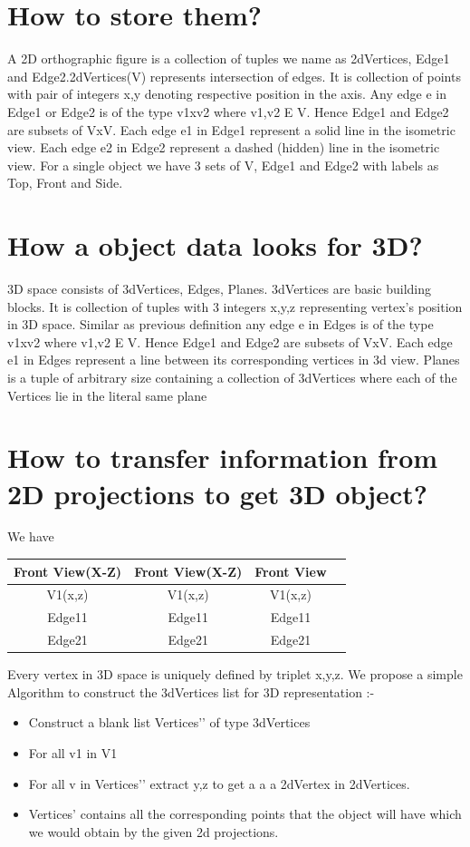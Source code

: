 \documentclass{article}
\begin{document}
\section{How to store them?}
A 2D orthographic figure is a collection of tuples we name as 2dVertices, Edge1 and Edge2.2dVertices(V) represents intersection of edges. It is collection of points with pair of integers x,y denoting respective position in the axis. Any edge e in Edge1 or Edge2 is of the type v1xv2 where v1,v2 E V. Hence Edge1 and Edge2 are subsets of VxV. Each edge e1 in Edge1 represent a solid line in the isometric view. Each edge e2 in Edge2 represent a dashed (hidden) line in the isometric view. For a single object we have 3 sets of {V, Edge1 and Edge2} with labels as Top, Front and Side.
\section{How a object data looks for 3D?}
3D space consists of 3dVertices, Edges, Planes.
3dVertices are basic building blocks. It is collection of tuples with 3 integers x,y,z representing vertex’s position in 3D space.
Similar as previous definition any edge e in Edges is of the type v1xv2 where v1,v2 E V. Hence Edge1 and Edge2 are subsets of VxV. Each edge e1 in Edges represent a line between its corresponding vertices in 3d view.
Planes is a tuple of arbitrary size containing a collection of 3dVertices where each of the Vertices lie in the literal same plane

\section{How to transfer information from 2D projections to get 3D object?}
We have 
\begin{table}[h!]
\centering
\begin{tabular}{||c c c c||} 
 \hline
 Front View(X-Z) & Front View(X-Z) & Front View \\ [0.5ex] 
 \hline\hline
 V1(x,z) & V1(x,z) & V1(x,z) \\ 
 Edge11 & Edge11 & Edge11 \\
 Edge21 & Edge21 & Edge21 \\ [1ex] 
 \hline
\end{tabular}
\label{table:1}
\end{table}
Every vertex in 3D space is uniquely defined by triplet x,y,z. We propose a simple Algorithm to construct the 3dVertices list for 3D representation :-
\begin{itemize}
\item Construct a blank list Vertices’’ of type 3dVertices
\item For all v1 in V1
\item For all v in Vertices’’ extract y,z to get a a a 2dVertex in 2dVertices.
\item Vertices’ contains all the corresponding points that the object will have which we would obtain by the given 2d projections.

\end{itemize}
\end{document}

